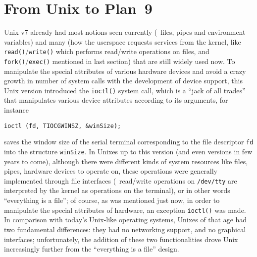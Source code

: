 \section{From Unix to Plan~9}\label{sec:plan9}

Unix v7 already had most notions seen currently
(\eg~files, pipes and environment variables) and many  (how the userspace requests services from the kernel, like
\verb|read()|/\verb|write()| which performs read/write operations on files,
and \verb|fork()|/\verb|exec()| mentioned in last section) that are still
widely used now.  To manipulate the special attributes of various hardware
devices and avoid a crazy growth in number of system calls with the development
of device support, this Unix version introduced the \verb|ioctl()| system call,
which is a ``jack of all trades'' that manipulates various device attributes
according to its arguments, for instance
\begin{wquoting}
\begin{Verbatim}
ioctl (fd, TIOCGWINSZ, &winSize);
\end{Verbatim}
\end{wquoting}
saves the window size of the serial terminal corresponding to the file
descriptor \verb|fd| into the structure \verb|winSize|.  In Unixes up to this
version (and even versions in few years to come), although there were different
kinds of system resources like files, pipes, hardware devices \etc{} to operate
on, these operations were generally implemented through file interfaces
(\eg~read/write operations on \verb|/dev/tty| are interpreted by the kernel
as operations on the terminal), or in other words ``everything is a file''; of
course, as was mentioned just now, in order to manipulate the special attributes
of hardware, an exception \verb|ioctl()| was made.  In comparison with today's
Unix-like operating systems, Unixes of that age had two fundamental differences:
they had no networking support, and no graphical interfaces; unfortunately,
the addition of these two functionalities drove Unix increasingly
further from the ``everything is a file'' design.

